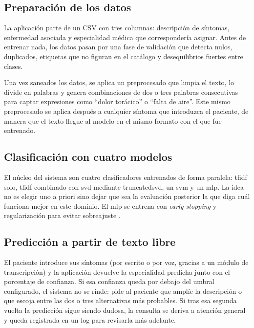 \subsection{Preparación de los datos}

La aplicación parte de un CSV con tres columnas: descripción de síntomas, enfermedad asociada y especialidad médica que correspondería asignar. Antes de entrenar nada, los datos pasan por una fase de validación que detecta nulos, duplicados, etiquetas que no figuran en el catálogo y desequilibrios fuertes entre clases.

Una vez saneados los datos, se aplica un preprocesado que limpia el texto, lo divide en palabras y genera combinaciones de dos o tres palabras consecutivas para captar expresiones como ``dolor torácico'' o ``falta de aire''. Este mismo preprocesado se aplica después a cualquier síntoma que introduzca el paciente, de manera que el texto llegue al modelo en el mismo formato con el que fue entrenado.


\subsection{Clasificación con cuatro modelos}

El núcleo del sistema son cuatro clasificadores entrenados de forma paralela: \gls{tfidf} solo, \gls{tfidf} combinado con \gls{svd} mediante \gls{truncatedsvd}, un \gls{svm} y un \gls{mlp}. La idea no es elegir uno a priori sino dejar que sea la evaluación posterior la que diga cuál funciona mejor en este dominio. El \gls{mlp} se entrena con \textit{early stopping} y regularización para evitar sobreajuste \cite{ibm_redes_neuronales, aws_sobreajuste}.

\subsection{Predicción a partir de texto libre}

El paciente introduce sus síntomas (por escrito o por voz, gracias a un módulo de transcripción) y la aplicación devuelve la especialidad predicha junto con el porcentaje de confianza. Si esa confianza queda por debajo del umbral configurado, el sistema no se rinde: pide al paciente que amplíe la descripción o que escoja entre las dos o tres alternativas más probables. Si tras esa segunda vuelta la predicción sigue siendo dudosa, la consulta se deriva a atención general y queda registrada en un log para revisarla más adelante.

